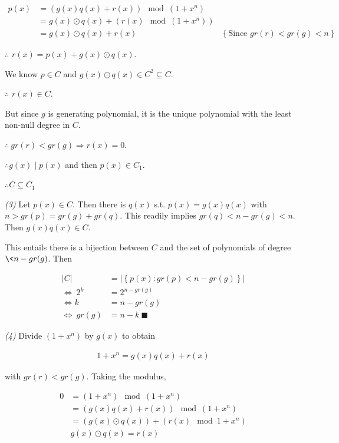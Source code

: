 \documentclass[a4paper, 12pt]{article}
\begin{document}
\begin{align*}
    p(x) &= \left( g(x) q(x) + r(x) \right)  \mod (1 + x^n)\\ 
         &= g(x) \odot q(x) + \left( r(x) \mod (1 + x^n) \right)  \\ 
         &= g(x) \odot q(x) + r(x) &\left\{ \text{Since $gr(r) < gr(g) < n$} \right\} 
\end{align*}

$\therefore $ $r(x) = p(x) + g(x) \odot q(x)$. 

We know $p \in C$ and $g(x) \odot q(x) \in C^2 \subseteq C$. 

$\therefore $ $r(x) \in C$.

But since $g$ is generating polynomial, it is the unique polynomial with the
least non-null degree in $C$.

$\therefore ~ gr(r) < gr(g) \Rightarrow r(x) = 0$.

$\therefore g(x) \mid p(x)$ and then $p(x) \in C_1$.

$\therefore C \subseteq C_1$

\textit{(3)} Let $p(x) \in C$. Then there is $q(x)$ s.t. $p(x) = g(x) q(x)$
with $n > gr(p) = gr(g) + gr(q)$. This readily implies $gr(q) < n - gr(g) < n$.
Then $g(x) q(x) \in C$.

This entails there is a bijection between $C$ and the set of polynomials of
degree $\< n - gr(g)$. Then 

\begin{align*}
    |C| &= |\left\{ p(x) : gr(p) < n - gr(g) \right\} | \\ 
    \iff ~ 2^k &= 2^{n-gr(g)} \\ 
    \iff k &= n - gr(g) \\ 
    \iff ~ gr(g) &= n - k ~ \blacksquare
\end{align*}

\textit{(4)} Divide $(1 + x^n)$ by $g(x)$ to obtain 

\begin{align*}
    1 + x^n = g(x) q(x) + r(x)
\end{align*}

with $gr(r) < gr(g)$. Taking the modulus, 

\begin{align*}
    0 &= (1 + x^n) \mod (1 + x^n) \\ 
      &=\left( g(x) q(x) + r(x) \right) \mod (1 + x^n) \\ 
      &= \left( g(x) \odot q(x) \right)  + \left( r(x) \mod 1 + x^n \right)  \\ 
      & g(x) \odot q(x) = r(x)
\end{align*}
\end{document}

